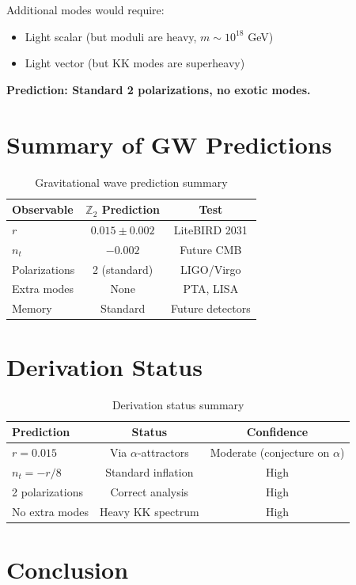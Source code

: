 \documentclass[12pt,a4paper]{article}
\begin{document}
Additional modes would require:
\begin{itemize}
    \item Light scalar (but moduli are heavy, $m \sim 10^{18}$ GeV)
    \item Light vector (but KK modes are superheavy)
\end{itemize}

\textbf{Prediction: Standard 2 polarizations, no exotic modes.}

\section{Summary of GW Predictions}

\begin{table}[h]
\centering
\begin{tabular}{lcc}
\toprule
Observable & $\mathbb{Z}_2$ Prediction & Test \\
\midrule
$r$ & $0.015 \pm 0.002$ & LiteBIRD 2031 \\
$n_t$ & $-0.002$ & Future CMB \\
Polarizations & 2 (standard) & LIGO/Virgo \\
Extra modes & None & PTA, LISA \\
Memory & Standard & Future detectors \\
\bottomrule
\end{tabular}
\caption{Gravitational wave prediction summary}
\end{table}

\section{Derivation Status}

\begin{table}[h]
\centering
\begin{tabular}{lcc}
\toprule
Prediction & Status & Confidence \\
\midrule
$r = 0.015$ & Via $\alpha$-attractors & Moderate (conjecture on $\alpha$) \\
$n_t = -r/8$ & Standard inflation & High \\
2 polarizations & Correct analysis & High \\
No extra modes & Heavy KK spectrum & High \\
\bottomrule
\end{tabular}
\caption{Derivation status summary}
\end{table}

\section{Conclusion}
\end{document}
